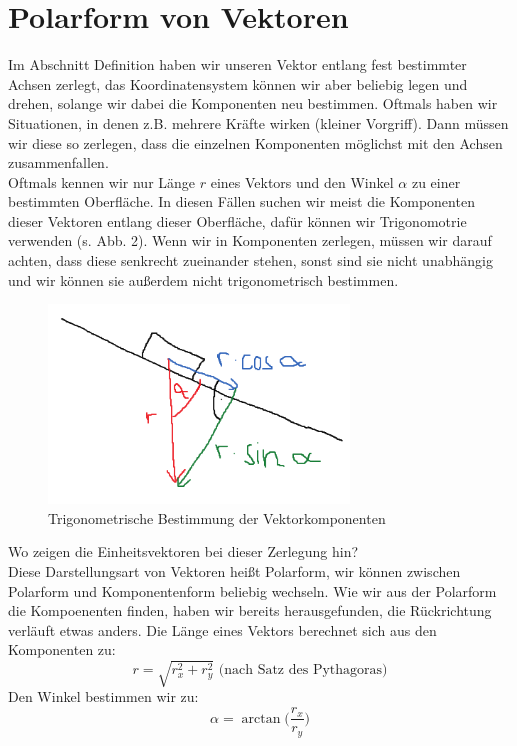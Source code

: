 \documentclass[11pt]{article}
\begin{document}
\section{Polarform von Vektoren}
Im Abschnitt Definition haben wir unseren Vektor entlang fest bestimmter Achsen zerlegt, das Koordinatensystem können wir aber beliebig legen und drehen, solange wir dabei die Komponenten neu bestimmen. Oftmals haben wir Situationen, in denen z.B. mehrere Kräfte wirken (kleiner Vorgriff). Dann müssen wir diese so zerlegen, dass die einzelnen Komponenten möglichst mit den Achsen zusammenfallen. \\

Oftmals kennen wir nur Länge $r$ eines Vektors und den Winkel $\alpha$ zu einer bestimmten Oberfläche. In diesen Fällen suchen wir meist die Komponenten dieser Vektoren entlang dieser Oberfläche, dafür können wir Trigonomotrie verwenden (s. Abb. 2). Wenn wir in Komponenten zerlegen, müssen wir darauf achten, dass diese senkrecht zueinander stehen, sonst sind sie nicht unabhängig und wir können sie außerdem nicht trigonometrisch bestimmen.
\begin{figure}[H]
    \includegraphics[width=8cm]{vektor-komponenten-trig.png}
    \centering
    \caption{Trigonometrische Bestimmung der Vektorkomponenten}
\end{figure}  
Wo zeigen die Einheitsvektoren bei dieser Zerlegung hin? \\

Diese Darstellungsart von Vektoren heißt Polarform, wir können zwischen Polarform und Komponentenform beliebig wechseln. Wie wir aus der Polarform die Kompoenenten finden, haben wir bereits herausgefunden, die Rückrichtung verläuft etwas anders. Die Länge eines Vektors berechnet sich aus den Komponenten zu: 
$$ r = \sqrt{r_x^2 + r_y^2} \text{ (nach Satz des Pythagoras)}$$
Den Winkel bestimmen wir zu: 
$$\alpha = \arctan\bigg(\frac{r_x}{r_y}\bigg)$$
\end{document}
